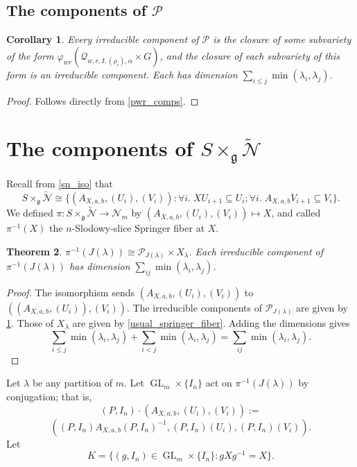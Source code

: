 \documentclass[12pt,psamsfonts]{article}
\DeclareMathOperator{\GL}{GL}
\newtheorem{theorem}{Theorem}[section]
\newtheorem{corollary}[theorem]{Corollary}
\begin{document}
\subsection{The components of \texorpdfstring{\(\mathcal{P}\)}{P}}
\begin{corollary}\label{p_comps}
    Every irreducible component of \(\mathcal{P}\) is the closure of some subvariety of the form \(\varphi_{wr}(\mathcal{Q}_{w,r,I,(\rho_i),\alpha} \times G)\), and the closure of each subvariety of this form is an irreducible component.
    Each has dimension \(\sum_{i \leq j} \min(\lambda_i, \lambda_j)\).
\end{corollary}
\begin{proof}
    Follows directly from \cref{pwr_comps}.
\end{proof}

\section{The components of \texorpdfstring{\(S \times_\mathfrak{g} \widetilde{\mathcal{N}}\)}{S x\_g N}}\label{sxn_comps}
Recall from \cref{sn_iso} that 
\[S \times_\mathfrak{g} \widetilde{\mathcal{N}} \cong \{(A_{X,a,b}, (U_i), (V_i)) : \forall i. \; XU_{i + 1} \subseteq U_i; \forall i. \; A_{X,a,b} V_{i + 1} \subseteq V_i\}.\]
We defined \(\pi : S \times_\mathfrak{g} \widetilde{\mathcal{N}} \to \mathcal{N}_m\) by \((A_{X,a,b}, (U_i), (V_i)) \mapsto X\), and called \(\pi^{-1}(X)\) the \(n\)-Slodowy-slice Springer fiber at \(X\).
\begin{theorem}\label{springer_fiber_comps}
    \(\pi^{-1}(J(\lambda)) \cong \mathcal{P}_{J(\lambda)} \times X_\lambda\).
    Each irreducible component of \(\pi^{-1}(J(\lambda))\) has dimension \(\sum_{ij} \min(\lambda_i, \lambda_j)\).
\end{theorem}
\begin{proof}
    The isomorphism sends \((A_{X,a,b}, (U_i), (V_i))\) to \(((A_{X, a, b}, (U_i)), (V_i))\).
    The irreducible components of \(\mathcal{P}_{J(\lambda)}\) are given by \cref{p_comps}.
    Those of \(X_\lambda\) are given by \cref{usual_springer_fiber}.
    Adding the dimensions gives 
    \[\sum_{i \leq j} \min(\lambda_i, \lambda_j) + \sum_{i < j} \min(\lambda_i, \lambda_j) = \sum_{ij} \min(\lambda_i, \lambda_j).\]
\end{proof}

Let \(\lambda\) be any partition of \(m\).
Let \(\GL_m \times \{I_n\}\) act on \(\pi^{-1}(J(\lambda))\) by conjugation; that is,
\[(P, I_n) \cdot (A_{X, a, b}, (U_i), (V_i)) := \]
\[((P,I_n)A_{X,a,b}(P,I_n)^{-1},(P,I_n)(U_i), (P,I_n)(V_i)).\]
Let 
\[K = \{(g, I_n) \in \GL_m \times \{I_n\} : gXg^{-1} = X\}.\]
\end{document}
